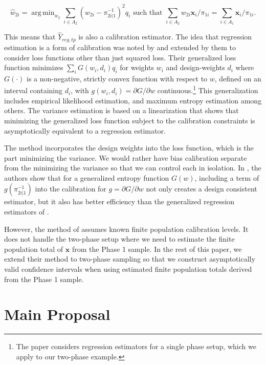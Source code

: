 \documentclass[12pt]{article}
\DeclareMathOperator*{\argmin}{arg\,min}
\renewcommand{\bf}[1]{\mathbf{#1}}
\begin{document}
$$
\hat w_{2i} = \argmin_{w_2} \sum_{i \in A_2} (w_{2i} - \pi_{2i|1}^{-1})^2 q_i
\text{ such that } \sum_{i \in A_2} w_{2i} \bf x_i / \pi_{1i} = \sum_{i \in A_1}
\bf x_i / \pi_{1i}.
$$

This means that $\hat Y_{reg, tp}$ is also a calibration estimator. The idea
that regression estimation is a form of calibration was noted by
\cite{deville1992calibration} and extended by them to consider loss functions
other than just squared loss. Their generalized loss function minimizes
$\sum_i G(w_i, d_i)q_i$ for weights $w_i$ and design-weights $d_i$ where
$G(\cdot)$ is a non-negative, strictly convex function with respect to $w$,
defined on an interval containing $d_i$, with $g(w_i, d_i) = \partial G /
\partial w$ continuous.\footnote{The \cite{deville1992calibration} paper
considers regression estimators for a single phase setup, which we apply to our
two-phase example.} This
generalization includes empirical likelihood estimation, and maximum entropy
estimation among others. The variance estimation is based on a linearization
that shows that minimizing the generalized loss function subject to the
calibration constraints is asymptotically equivalent to a regression estimator.


The \cite{deville1992calibration} method incorporates the design weights into
the loss function, which is the part minimizing the variance. We would rather
have bias calibration separate from the minimizing the variance so that
we can control each in isolation. In
\cite{kwon2024debiased}, the authors show that for a generalized entropy
function $G(w)$, including a term of $g(\pi_{2i|1}^{-1})$ into the calibration
for $g = \partial G / \partial w$ not only creates a design consistent
estimator, but it also has better efficiency than the generalized regression
estimators of \cite{deville1992calibration}.

However, the method of \cite{kwon2024debiased} assumes known finite population 
calibration levels. It does not handle the
two-phase setup where we need to estimate the finite population total of $\bf x$
from the Phase 1 sample. In the rest of this paper, we extend their method to 
two-phase sampling so that we construct asymptotically valid confidence
intervals when using estimated finite population totals derived from the Phase 1
sample.


\section{Main Proposal}
\end{document}
